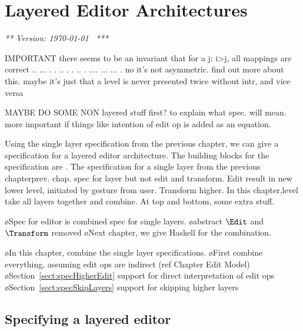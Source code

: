 \chapter{Layered Editor Architectures}
\label{chap:layeredArchs}
{\em *** Version: \today~ ***}


\renewcommand{\present}[0]{{\tt present}}					%
\renewcommand{\interpret}[0]{{\tt interpret}}				%

\bc

IMPORTANT there seems to be an invariant that for a j:  i>j, all mappings are correct 
  ..           ...       
 .  .    ..   .   .   .. 
.    ....  ...     ...  .
no it's not asymmetric. find out more about this.
maybe it's just that a level is never presented twice without intr, and vice versa


MAYBE DO SOME NON layered stuff first? to explain what spec. will mean. more important if things like intention of edit op is added as an equation.
\ec


\bc
Using the single layer specification from the previous chapter, we can give a specification for a layered editor architecture. The building blocks for the specification are . The specification for a single layer from the previous chapterprev. chap. spec for layer but not edit and transform. Edit result in new lower level, initiated by gesture from user. Transform higher. In this chapter,level take all layers together and combine. At top and bottom, some extra stuff.
\ec

\bl
\o Spec for editor is combined spec for single layers.
\o abstract $\Edit$ and $\Transform$ removed
\o Next chapter, we give Haskell for the combination.
\el

\bl
\o In this chapter, combine the single layer specifications.
\o First combine everything, assuming edit ops are indirect (ref Chapter Edit Model)
\o Section~\ref{sect:specHigherEdit} support for direct interpretation of edit ops
\o Section~\ref{sect:specSkipLayers} support for skipping higher layers
\el

\fromHere  %

\section{Specifying a layered editor}\label{sect:specCombination}

